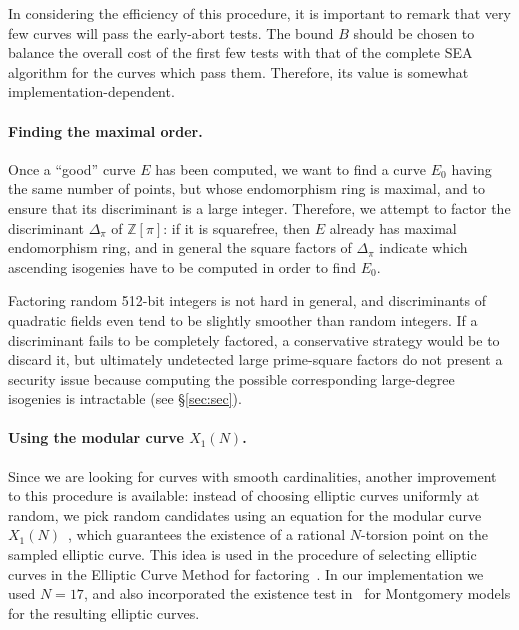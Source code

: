 \documentclass{llncs}
\newcommand{\Z}{\mathbb{Z}}
\begin{document}
In considering the efficiency of this procedure, it is important to remark
that very few curves will pass the early-abort tests. 
The bound $B$ should be chosen 
to balance the overall cost of the first few tests with that of
the complete SEA algorithm for the curves which pass them. Therefore,
its value is somewhat implementation-dependent. 

\paragraph{Finding the maximal order.}
Once a ``good'' curve $E$ has been computed, we want to find a curve
$E_0$ having the same number of points, but whose endomorphism ring is maximal, and
to ensure that its discriminant is a large integer. Therefore, we attempt to
factor the discriminant $Δ_\pi$ of $\Z[\pi]$: if it is squarefree,
then $E$ already has maximal endomorphism ring, and in general the square
factors of $Δ_\pi$ indicate which ascending isogenies have to be computed
in order to find $E_0$.

\begin{remark}
    Factoring random 512-bit integers is not hard in general, 
    and discriminants of quadratic fields
    even tend to be slightly smoother than random integers.
    If a discriminant fails to be completely factored,
		a conservative strategy would be to discard it,
    but ultimately undetected large prime-square factors
    do not present a security issue
    because computing the possible corresponding large-degree isogenies 
    is intractable (see \S\ref{sec:sec}).
\end{remark}

\paragraph{Using the modular curve $X_1(N)$.}
Since we are looking for curves with smooth cardinalities, another
improvement to this procedure is available: instead of choosing elliptic
curves uniformly at random, we pick random candidates using
an equation for the modular curve $X_1(N)$~\cite{sutherland2012constructing},
which guarantees the existence of a rational $N$-torsion point
on the sampled elliptic curve.
This idea is used
in the procedure of selecting elliptic curves in the Elliptic Curve Method
for factoring~\cite{ECM20,GMP-ECM}.
In our implementation we used $N = 17$,
and also incorporated the existence test in~\cite{OKS00}
for Montgomery models for the resulting elliptic curves.
\end{document}
